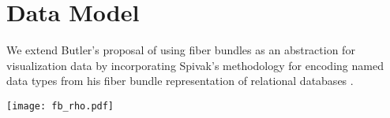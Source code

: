 \documentclass[11pt,titlepage]{amsart}
\begin{document}
\section{Data Model}
\label{sec:data models}
We extend Butler's proposal of using fiber bundles as an abstraction for visualization data\cite{butlerVectorBundleClassesForm1992,butlerVisualizationModelBased1989} by incorporating Spivak's methodology for encoding named data types from his fiber bundle representation of relational databases \cite{spivakDatabasesAreCategories2010,spivakSimplicialDatabases2009}.


\begin{multicols}{2}
    \texttt{[image: fb\_rho.pdf]}
    \columnbreak
    \label{fig:fiber_bundle}

\end{multicols}
\end{document}
